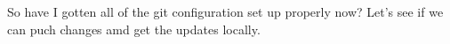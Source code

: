 %
%
\specialreq             %

So have I gotten all of the git configuration set up properly now? Let's see if we can puch changes amd get the updates locally.
